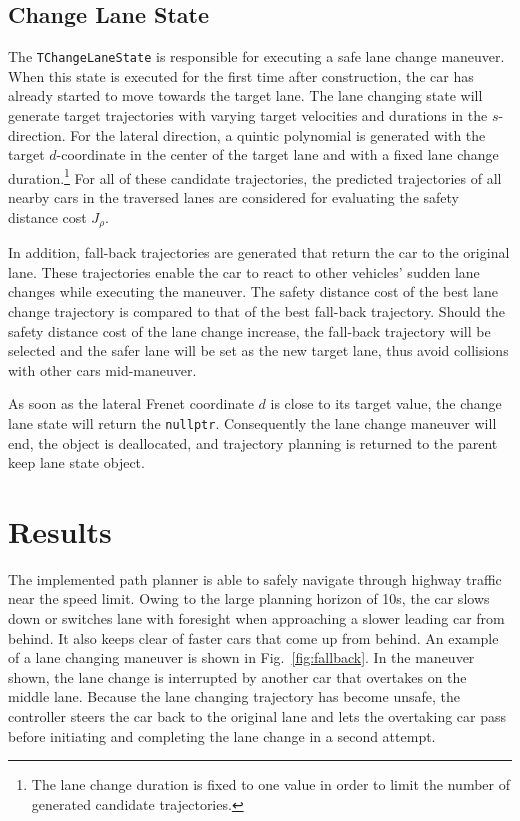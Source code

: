\documentclass[twoside]{article}
\newcommand{\code}[1]{{\texttt{#1}}}
\newcommand{\figref}[1]{Fig.~\ref{fig:#1}}
\begin{document}
\subsection{Change Lane State}
The \code{TChangeLaneState} is responsible for executing a safe lane change maneuver. When this
state is executed for the first time after construction, the car has already started to move
towards the target lane. The lane changing state will generate target trajectories with varying
target velocities and durations in the $s$-direction. For the lateral direction, a quintic polynomial is generated with the target $d$-coordinate in the center of the target lane and with a fixed lane change duration.\hspace{-0.08em}\footnote{The lane change duration is fixed to one
value in order to limit the number of generated candidate trajectories.} For all of these candidate trajectories, the predicted trajectories of all nearby
cars in the traversed lanes are considered for evaluating the safety distance cost $J_\rho$.

In addition, fall-back trajectories are generated that return the car to the original lane.
These trajectories enable the car to react to other vehicles' sudden
lane changes while executing the maneuver. The safety distance cost of the best lane
change trajectory is compared to that of the best fall-back trajectory. Should the safety
distance cost of the lane change increase, the fall-back trajectory will be selected and the
safer lane will be set as the new target lane, thus avoid collisions with other cars mid-maneuver.

As soon as the lateral Frenet coordinate $d$ is close to its target value, the change lane state
will return the \code{nullptr}. Consequently the lane change maneuver will end, the object is
deallocated, and trajectory planning is returned to the parent keep lane state object.

\section{Results}
The implemented path planner is able to safely navigate through highway traffic near the speed
limit. Owing to the large planning horizon of 10s, the car slows down or switches lane with
foresight when approaching a slower leading car from behind. It also keeps clear of faster
cars that come up from behind. An example of a lane changing maneuver is shown in \figref{fallback}. In the maneuver shown, the lane change is interrupted by another car that
overtakes on the middle lane. Because the lane changing trajectory has become unsafe, the
controller steers the car back to the original lane and lets the overtaking car pass before
initiating and completing the lane change in a second attempt.
\end{document}
